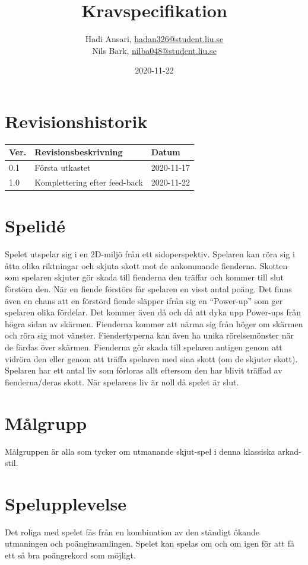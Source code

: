 \documentclass{TDP005mall}
\author{Hadi Ansari, \url{hadan326@student.liu.se}\\
  Nils Bark, \url{nilba048@student.liu.se}}
\title{Kravspecifikation}
\date{2020-11-22}
\begin{document}
\projectpage
\section{Revisionshistorik}
\begin{table}[!h]
\begin{tabularx}{\linewidth}{|l|X|l|}
\hline
Ver. & Revisionsbeskrivning & Datum \\\hline
0.1 & Första utkastet & 2020-11-17 \\\hline
1.0 & Komplettering efter feed-back& 2020-11-22 \\\hline

\end{tabularx}
\end{table}


\section{Spelidé}
Spelet utspelar sig i en 2D-miljö från ett sidoperspektiv. Spelaren kan röra sig i åtta olika riktningar och skjuta skott mot de ankommande fienderna. Skotten som spelaren skjuter gör skada till fienderna den träffar och kommer till slut förstöra den. När en fiende förstörs får spelaren en visst antal poäng. Det finns även en chans att en förstörd fiende släpper ifrån sig en ``Power-up'' som ger spelaren olika fördelar. Det kommer även då och då att dyka upp Power-ups från högra sidan av skärmen. Fienderna kommer att närma sig från höger om skärmen och röra sig mot vänster. Fiendertyperna kan även ha unika rörelsemönster när de färdas över skärmen. Fienderna gör skada till spelaren antigen genom att vidröra den eller genom att träffa spelaren med sina skott (om de skjuter skott). Spelaren har ett antal liv som förloras allt eftersom den har blivit träffad av fienderna/deras skott. När spelarens liv är noll då spelet är slut.

\section{Målgrupp}
Målgruppen är alla som tycker om utmanande skjut-spel i denna klassiska arkad-stil.

\section{Spelupplevelse}
Det roliga med spelet fås från en kombination av den ständigt ökande utmaningen och poänginsamlingen. Spelet kan spelas om och om igen för att få ett så bra poängrekord som möjligt.
\end{document}
